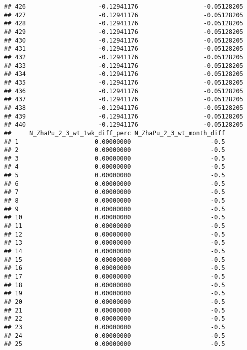 \documentclass[]{article}
\begin{document}
\begin{verbatim}
## 426                    -0.12941176                  -0.05128205
## 427                    -0.12941176                  -0.05128205
## 428                    -0.12941176                  -0.05128205
## 429                    -0.12941176                  -0.05128205
## 430                    -0.12941176                  -0.05128205
## 431                    -0.12941176                  -0.05128205
## 432                    -0.12941176                  -0.05128205
## 433                    -0.12941176                  -0.05128205
## 434                    -0.12941176                  -0.05128205
## 435                    -0.12941176                  -0.05128205
## 436                    -0.12941176                  -0.05128205
## 437                    -0.12941176                  -0.05128205
## 438                    -0.12941176                  -0.05128205
## 439                    -0.12941176                  -0.05128205
## 440                    -0.12941176                  -0.05128205
##     N_ZhaPu_2_3_wt_1wk_diff_perc N_ZhaPu_2_3_wt_month_diff
## 1                     0.00000000                      -0.5
## 2                     0.00000000                      -0.5
## 3                     0.00000000                      -0.5
## 4                     0.00000000                      -0.5
## 5                     0.00000000                      -0.5
## 6                     0.00000000                      -0.5
## 7                     0.00000000                      -0.5
## 8                     0.00000000                      -0.5
## 9                     0.00000000                      -0.5
## 10                    0.00000000                      -0.5
## 11                    0.00000000                      -0.5
## 12                    0.00000000                      -0.5
## 13                    0.00000000                      -0.5
## 14                    0.00000000                      -0.5
## 15                    0.00000000                      -0.5
## 16                    0.00000000                      -0.5
## 17                    0.00000000                      -0.5
## 18                    0.00000000                      -0.5
## 19                    0.00000000                      -0.5
## 20                    0.00000000                      -0.5
## 21                    0.00000000                      -0.5
## 22                    0.00000000                      -0.5
## 23                    0.00000000                      -0.5
## 24                    0.00000000                      -0.5
## 25                    0.00000000                      -0.5

\end{verbatim}
\end{document}
